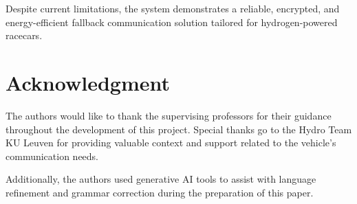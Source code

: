 \documentclass[conference]{IEEEtran}
\begin{document}
Despite current limitations, the system demonstrates a reliable, encrypted, and energy-efficient fallback communication solution tailored for hydrogen-powered racecars.

\section*{Acknowledgment}
The authors would like to thank the supervising professors for their guidance throughout the development of this project. Special thanks go to the Hydro Team KU Leuven for providing valuable context and support related to the vehicle's communication needs. 

Additionally, the authors used generative AI tools to assist with language refinement and grammar correction during the preparation of this paper.


\end{document}
